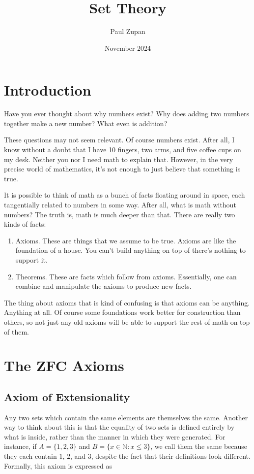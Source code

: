 \documentclass{article}
\title{Set Theory}
\author{Paul Zupan}
\date{November 2024}
\begin{document}
\maketitle

\section{Introduction}

Have you ever thought about why numbers exist? Why does adding two numbers
together make a new number? What even is addition?

These questions may not seem relevant. Of course numbers exist. After all, I
know without a doubt that I have 10 fingers, two arms, and five coffee cups on
my desk. Neither you nor I need math to explain that. However, in the very
precise world of mathematics, it's not enough to just believe that something is
true.

It is possible to think of math as a bunch of facts floating around in space,
each tangentially related to numbers in some way. After all, what is math
without numbers? The truth is, math is much deeper than that. There are really
two kinds of facts:

\begin{enumerate}
  \item Axioms. These are things that we assume to be true. Axioms are like the
    foundation of a house. You can't build anything on top of there's nothing
    to support it.
  \item Theorems. These are facts which follow from axioms. Essentially, one
    can combine and manipulate the axioms to produce new facts.
\end{enumerate}

The thing about axioms that is kind of confusing is that axioms can be
anything. Anything at all. Of course some foundations work better for
construction than others, so not just any old axioms will be able to support
the rest of math on top of them.

\section{The ZFC Axioms}

\subsection{Axiom of Extensionality}

Any two sets which contain the same elements are themselves the same. Another
way to think about this is that the equality of two sets is defined entirely by
what is inside, rather than the manner in which they were generated. For
instance, if $A = \{1, 2, 3\}$ and $B = \{x \in \mathbb{N} : x \leq 3\}$, we
call them the same because they each contain $1$, $2$, and $3$, despite the
fact that their definitions look different. Formally, this axiom is expressed
as
\end{document}
